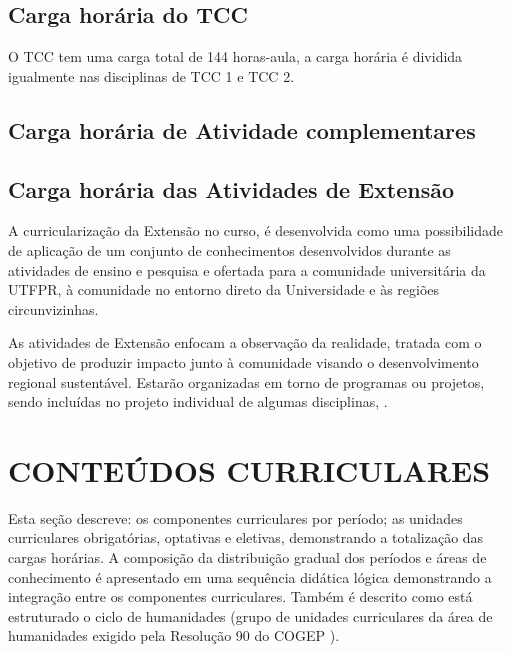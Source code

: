 
\subsection{Carga horária do TCC}

O TCC tem uma carga total de 144 horas-aula, a carga horária é dividida igualmente nas disciplinas de TCC 1 e TCC 2.

\subsection{Carga horária de Atividade complementares}


\subsection{Carga horária das Atividades de Extensão}
\label{sub:extch}

A curricularização da Extensão no curso, é desenvolvida como uma possibilidade de aplicação de um conjunto de conhecimentos desenvolvidos durante as atividades de ensino e pesquisa e ofertada para a comunidade universitária da UTFPR, à comunidade no entorno direto da Universidade e às regiões circunvizinhas.

As atividades de Extensão enfocam a observação da realidade, tratada com o objetivo de produzir impacto junto à comunidade visando o desenvolvimento regional sustentável. Estarão organizadas em torno de programas ou projetos, sendo incluídas no projeto individual de algumas disciplinas, .


\section{CONTEÚDOS CURRICULARES}

Esta seção descreve: os componentes curriculares por período; as unidades curriculares obrigatórias, optativas e eletivas, demonstrando a totalização das cargas horárias.  A composição da distribuição gradual dos períodos e áreas de conhecimento é apresentado em uma sequência didática lógica demonstrando a integração entre os componentes curriculares. Também é descrito como está estruturado o ciclo de humanidades (grupo de unidades curriculares da área de humanidades exigido pela Resolução 90 do COGEP \cite{cogep90}).


